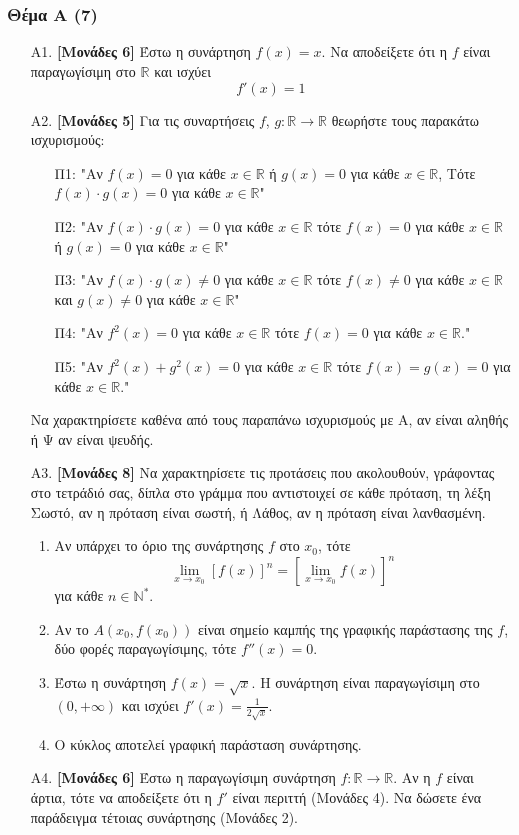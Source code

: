 \documentclass[14pt]{extarticle}
\begin{document}
\part*{}

\section*{Θέμα Α (7)}
\begin{enumerate}
 \item[Α1.] \textbf{[Μονάδες 6]} Έστω η συνάρτηση $f(x)=x$. Να αποδείξετε ότι η $f$ είναι παραγωγίσιμη στο $\mathbb{R}$ και ισχύει
       $$f'(x)=1$$
 \item[Α2.] \textbf{[Μονάδες 5]} Για τις συναρτήσεις $f$, $g:\mathbb{R}\to \mathbb{R}$ θεωρήστε τους παρακάτω ισχυρισμούς:
       \begin{enumerate}
        \item[Π1:] "Αν $f(x)=0$ για κάθε $x\in\mathbb{R}$ ή $g(x)=0$ για κάθε $x\in\mathbb{R}$, Τότε $f(x)\cdot g(x)=0$ για κάθε $x\in\mathbb{R}$"
        \item[Π2:] "Αν $f(x)\cdot g(x)=0$ για κάθε $x\in\mathbb{R}$ τότε $f(x)=0$ για κάθε $x\in\mathbb{R}$ ή $g(x)=0$ για κάθε $x\in\mathbb{R}$"
        \item[Π3:] "Αν $f(x)\cdot g(x)\ne 0$ για κάθε $x\in\mathbb{R}$ τότε $f(x)\ne 0$ για κάθε $x\in\mathbb{R}$ και $g(x)\ne 0$ για κάθε $x\in\mathbb{R}$"
        \item[Π4:] "Αν $f^2(x)=0$ για κάθε $x\in\mathbb{R}$ τότε $f(x)=0$ για κάθε $x\in\mathbb{R}$."
        \item[Π5:] "Αν $f^2(x)+g^2(x)=0$ για κάθε $x\in\mathbb{R}$ τότε $f(x)=g(x)=0$ για κάθε $x\in\mathbb{R}$."
       \end{enumerate}
       Να χαρακτηρίσετε καθένα από τους παραπάνω ισχυρισμούς με Α, αν είναι αληθής ή Ψ αν είναι ψευδής.
       
 \item[A3.] \textbf{[Μονάδες 8]} Να χαρακτηρίσετε τις προτάσεις που ακολουθούν, γράφοντας στο τετράδιό σας, δίπλα στο γράμμα που αντιστοιχεί σε κάθε πρόταση, τη λέξη Σωστό, αν η πρόταση είναι σωστή, ή Λάθος, αν η πρόταση είναι λανθασμένη.
       \begin{enumerate}
        \item Αν υπάρχει το όριο της συνάρτησης $f$ στο $x_0$, τότε $$\lim_{x\to x_0}[f(x)]^n=[\lim_{x\to x_0}f(x)]^n$$ για κάθε $n\in\mathbb{N^*}$.
        \item Αν το $Α(x_0,f(x_0))$ είναι σημείο καμπής της γραφικής παράστασης της $f$, δύο φορές παραγωγίσιμης, τότε $f''(x)=0$.
        \item Έστω η συνάρτηση $f(x)=\sqrt{x}$. Η συνάρτηση είναι παραγωγίσιμη στο $(0,+\infty)$ και ισχύει $f'(x)=\frac{1}{2\sqrt{x}}$.
        \item Ο κύκλος αποτελεί γραφική παράσταση συνάρτησης.
       \end{enumerate}
 \item[Α4.] \textbf{[Μονάδες 6]} Έστω η παραγωγίσιμη συνάρτηση $f:\mathbb{R}\to\mathbb{R}$. Αν η $f$ είναι άρτια, τότε να αποδείξετε ότι η $f'$ είναι περιττή (Μονάδες 4). Να δώσετε ένα παράδειγμα τέτοιας συνάρτησης (Μονάδες 2).
\end{enumerate}
\end{document}
